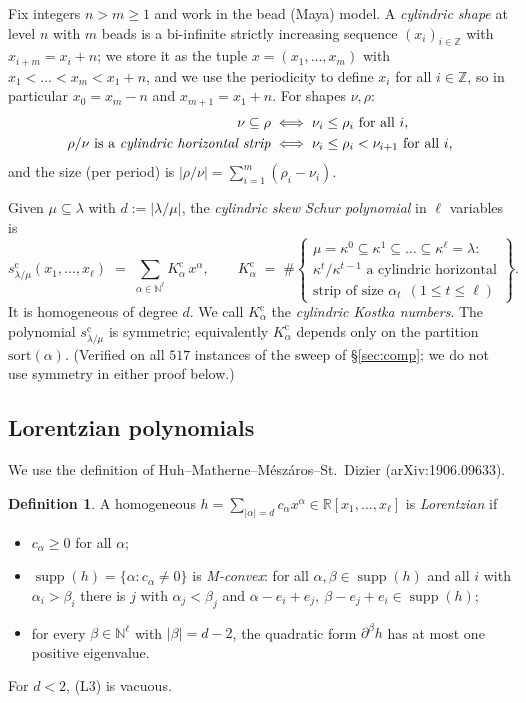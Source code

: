 \documentclass[11pt]{article}
\theoremstyle{definition}
\newtheorem{definition}[theorem]{Definition}
\DeclareMathOperator{\supp}{supp}
\newcommand{\Z}{\mathbb{Z}}
\newcommand{\N}{\mathbb{N}}
\newcommand{\R}{\mathbb{R}}
\newcommand{\scy}{s^{\mathrm{c}}}
\newcommand{\Kc}{K^{\mathrm{c}}}
\begin{document}
Fix integers $n>m\ge 1$ and work in the bead (Maya) model. A \emph{cylindric shape} at level
$n$ with $m$ beads is a bi-infinite strictly increasing sequence $(x_i)_{i\in\Z}$ with
$x_{i+m}=x_i+n$; we store it as the tuple $x=(x_1,\dots,x_m)$ with
$x_1<\dots<x_m<x_1+n$, and we use the periodicity to define $x_i$ for all $i\in\Z$, so in
particular $x_0=x_m-n$ and $x_{m+1}=x_1+n$. For shapes $\nu,\rho$:
\begin{align}
\nu\subseteq\rho &\iff \nu_i\le\rho_i \text{ for all } i, \label{eq:contain}\\
\rho/\nu \text{ is a \emph{cylindric horizontal strip}} &\iff
   \nu_i\le\rho_i<\nu_{i+1} \text{ for all } i, \label{eq:hstrip}
\end{align}
and the size (per period) is $|\rho/\nu|=\sum_{i=1}^m(\rho_i-\nu_i)$.

Given $\mu\subseteq\lambda$ with $d:=|\lambda/\mu|$, the \emph{cylindric skew Schur polynomial}
in $\ell$ variables is
\begin{equation}\label{eq:def-sc}
  \scy_{\lambda/\mu}(x_1,\dots,x_\ell)\;=\;\sum_{\alpha\in\N^\ell}\Kc_\alpha\,x^\alpha,
  \qquad
  \Kc_\alpha \;=\; \#\!\left\{
  \begin{array}{l}
  \mu=\kappa^0\subseteq\kappa^1\subseteq\dots\subseteq\kappa^\ell=\lambda:\\
  \kappa^{t}/\kappa^{t-1}\text{ a cylindric horizontal}\\
  \text{strip of size }\alpha_t\ \ (1\le t\le\ell)
  \end{array}\right\}.
\end{equation}
It is homogeneous of degree $d$. We call $\Kc_\alpha$ the \emph{cylindric Kostka numbers}.
The polynomial $\scy_{\lambda/\mu}$ is symmetric; equivalently $\Kc_\alpha$ depends only on the
partition $\mathrm{sort}(\alpha)$. (Verified on all $517$ instances of the sweep of
\S\ref{sec:comp}; we do not use symmetry in either proof below.)

\subsection{Lorentzian polynomials}

We use the definition of Huh--Matherne--M\'esz\'aros--St.~Dizier
\cite[Def.~2.1]{HMMS} (arXiv:1906.09633).

\begin{definition}\label{def:lor}
A homogeneous $h=\sum_{|\alpha|=d}c_\alpha x^\alpha\in\R[x_1,\dots,x_\ell]$ is
\emph{Lorentzian} if
\begin{itemize}
\item[(L1)] $c_\alpha\ge 0$ for all $\alpha$;
\item[(L2)] $\supp(h)=\{\alpha:c_\alpha\ne0\}$ is \emph{M-convex}: for all
  $\alpha,\beta\in\supp(h)$ and all $i$ with $\alpha_i>\beta_i$ there is $j$ with
  $\alpha_j<\beta_j$ and $\alpha-e_i+e_j,\ \beta-e_j+e_i\in\supp(h)$;
\item[(L3)] for every $\beta\in\N^\ell$ with $|\beta|=d-2$, the quadratic form $\partial^\beta h$
  has at most one positive eigenvalue.
\end{itemize}
For $d<2$, (L3) is vacuous.
\end{definition}
\end{document}

